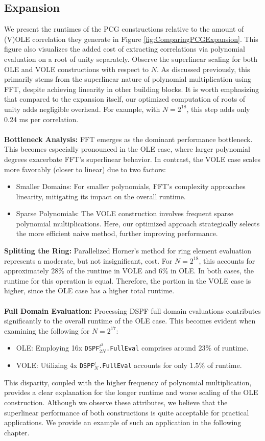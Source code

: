 \subsection{Expansion}
We present the runtimes of the PCG constructions relative to the amount of (V)OLE correlation they generate in Figure \ref{fig:ComparingPCGExpansion}. This figure also visualizes the added cost of extracting correlations via polynomial evaluation on a root of unity separately. Observe the superlinear scaling for both OLE and VOLE constructions with respect to $N$. As discussed previously, this primarily stems from the superlinear nature of polynomial multiplication using FFT, despite achieving linearity in other building blocks. It is worth emphasizing that compared to the expansion itself, our optimized computation of roots of unity adds negligible overhead. For example, with $N=2^{18}$, this step adds only 0.24 ms per correlation.
\\\\
\textbf{Bottleneck Analysis:} FFT emerges as the dominant performance bottleneck. This becomes especially pronounced in the OLE case, where larger polynomial degrees exacerbate FFT's superlinear behavior. In contrast, the VOLE case scales more favorably (closer to linear) due to two factors:
\begin{itemize}
\item Smaller Domains: For smaller polynomials, FFT's complexity approaches linearity, mitigating its impact on the overall runtime.
\item Sparse Polynomials: The VOLE construction involves frequent sparse polynomial multiplications. Here, our optimized approach strategically selects the more efficient naive method, further improving performance.
\end{itemize}

\textbf{Splitting the Ring:}  Parallelized Horner's method for ring element evaluation represents a moderate, but not insignificant, cost. For $N=2^{18}$, this accounts for approximately 28\% of the runtime in VOLE and 6\% in OLE. In both cases, the runtime for this operation is equal. Therefore, the portion in the VOLE case is higher, since the OLE case has a higher total runtime.
\\\\
\textbf{Full Domain Evaluation:} Processing DSPF full domain evaluations contributes significantly to the overall runtime of the OLE case. This becomes evident when examining the following for $N=2^{17}$:
\begin{itemize}
\item OLE: Employing 16x \texttt{DSPF$^{t^2}_{2N}$.FullEval} comprises around 23\% of runtime.
\item VOLE: Utilizing 4x \texttt{DSPF$^{t}_{N}$.FullEval} accounts for only 1.5\% of runtime.  
\end{itemize}
This disparity, coupled with the higher frequency of polynomial multiplication, provides a clear explanation for the longer runtime and worse scaling of the OLE construction. Although we observe these attributes, we believe that the superlinear performance of both constructions is quite acceptable for practical applications. We provide an example of such an application in the following chapter.

